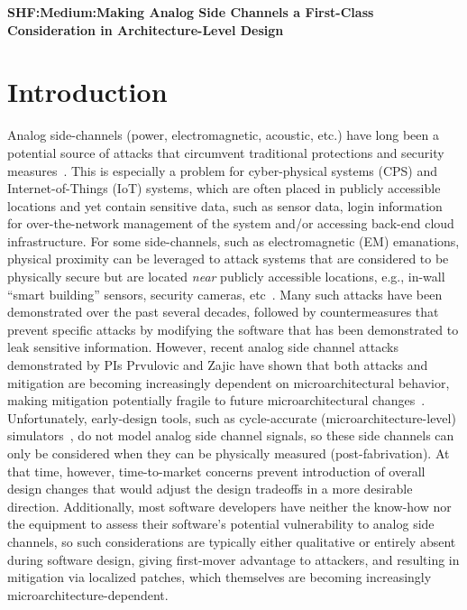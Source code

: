 \documentclass[11 pt]{article}
\begin{document}
\begin{center}
{\Large \textbf{SHF:Medium:Making Analog Side Channels a First-Class Consideration in Architecture-Level Design}}
\end{center}

\section{Introduction}
Analog side-channels (power, electromagnetic, acoustic, etc.) have long been a potential source of attacks that circumvent traditional protections and security measures~\cite{217605,Backes:2010:ASA:1929820.1929847,Balasch2015DPABA,10.1007/978-3-319-66787-4_27,4812164,Chari:2002:TA:648255.752740,Genkin:2016:EKE:2976749.2978353}. This is especially a problem for cyber-physical systems (CPS) and Internet-of-Things (IoT) systems, which are often placed in publicly accessible locations
and yet contain sensitive data, such as sensor data, login information for over-the-network management of the system and/or accessing back-end cloud infrastructure.
For some side-channels, such as electromagnetic (EM) emanations, physical proximity can be leveraged to attack systems that are considered to be physically secure but are located {\em near} publicly accessible locations, e.g., in-wall ``smart building'' sensors, security cameras, etc~\cite{10.1007/978-3-662-48324-4_11,6766222,Camurati:2018:SCE:3243734.3243802,8574570}.
Many such attacks have been demonstrated over the past several decades, followed by countermeasures that prevent specific attacks by modifying the software that has been demonstrated to leak sensitive information. However, recent analog side channel attacks demonstrated by PIs Prvulovic and Zajic have shown that both attacks and mitigation are becoming increasingly dependent on microarchitectural behavior, making mitigation potentially fragile to future microarchitectural changes~\cite{217605,Monjur21}.
Unfortunately, early-design tools, such as cycle-accurate (microarchitecture-level) simulators~\cite{Li:2009:MIP:1669112.1669172,Li:2011:CAM:2132325.2132479,509850,Ardestani:2013:EFM:2495252.2495480,Binkert:2011:GS:2024716.2024718,sesc,5982026,carlson2014aeohmcm}, do not model analog side channel signals, so these side channels can only be considered when they can be physically measured (post-fabrivation). At that time, however, time-to-market concerns prevent introduction of overall design changes that would adjust the design tradeoffs in a more desirable direction. Additionally, most software developers have neither the know-how nor the equipment to assess their software’s potential vulnerability to analog side channels, so such considerations are typically either qualitative or entirely absent during software design, giving first-mover advantage to attackers, and resulting in mitigation via localized patches, which themselves are becoming increasingly microarchitecture-dependent.
\end{document}
